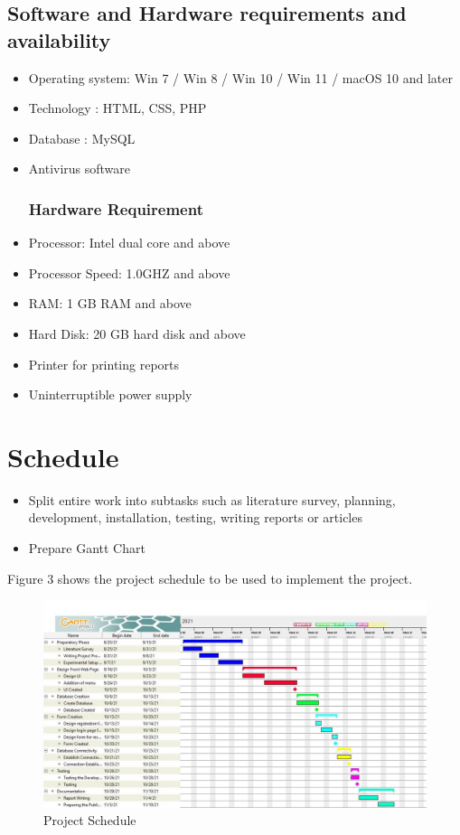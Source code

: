 \documentclass[english]{article}
\begin{document}
\subsection{Software and Hardware requirements and availability}
\begin{itemize}
\subsubsection {Software Requirement}
\item Operating system: Win 7 / Win 8 / Win 10 / Win 11 / macOS 10 and later
\item Technology : HTML, CSS, PHP
\item Database : MySQL
\item Antivirus software

\subsubsection {Hardware Requirement}
\item Processor: Intel dual core and above
\item Processor Speed: 1.0GHZ and above
\item RAM: 1 GB RAM and above
\item Hard Disk: 20 GB hard disk and above
\item Printer for printing reports
\item  Uninterruptible power supply

\end{itemize}
\section{Schedule} %

\begin{itemize}
\item Split entire work into subtasks such as literature survey, planning, development, installation, testing, writing reports or articles

\item Prepare Gantt Chart
\end{itemize}

Figure 3 shows the project schedule to be used to implement the project.

\begin{figure}[H]
\centering
\includegraphics[scale=0.4]{schedule.jpg}
\caption{Project Schedule}
\end{figure}
\end{document}
